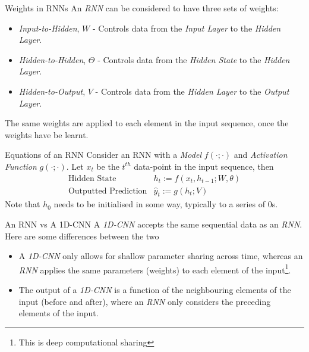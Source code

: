 \documentclass[11pt,a4paper]{article}
\begin{document}
  \begin{proposition}{Weights in RNNs}
    An \textit{RNN} can be considered to have three sets of weights:
    \begin{itemize}
      \item \textit{Input-to-Hidden}, $W$ - Controls data from the \textit{Input Layer} to the \textit{Hidden Layer}.
      \item \textit{Hidden-to-Hidden}, $\Theta$ - Controls data from the \textit{Hidden State} to the \textit{Hidden Layer}.
      \item \textit{Hidden-to-Output}, $V$ - Controls data from the \textit{Hidden Layer} to the \textit{Output Layer}.
    \end{itemize}
    The same weights are applied to each element in the input sequence, once the weights have be learnt.
  \end{proposition}

  \begin{proposition}{Equations of an RNN}
    Consider an RNN with a \textit{Model} $f(\cdot;\cdot)$ and \textit{Activation Function} $g(\cdot;\cdot)$. Let $x_t$ be the $t^{th}$ data-point in the input sequence, then
    \[\begin{array}{rl}
      \text{Hidden State}&h_t:=f(x_t,h_{t-1};W,\theta)\\
      \text{Outputted Prediction}&\hat{y}_t:=g(h_t;V)
    \end{array}\]
    Note that $h_0$ needs to be initialised in some way, typically to a series of 0s.
  \end{proposition}

  \begin{remark}{An RNN vs A 1D-CNN}
    A \textit{1D-CNN} accepts the same sequential data as an \textit{RNN}. Here are some differences between the two
    \begin{itemize}
      \item A \textit{1D-CNN} only allows for shallow parameter sharing across time, whereas an \textit{RNN} applies the same parameters (weights) to each element of the input\footnote{This is deep computational sharing}.
      \item The output of a \textit{1D-CNN} is a function of the neighbouring elements of the input (before and after), where an \textit{RNN} only considers the preceding elements of the input.
    \end{itemize}
  \end{remark}
\end{document}

